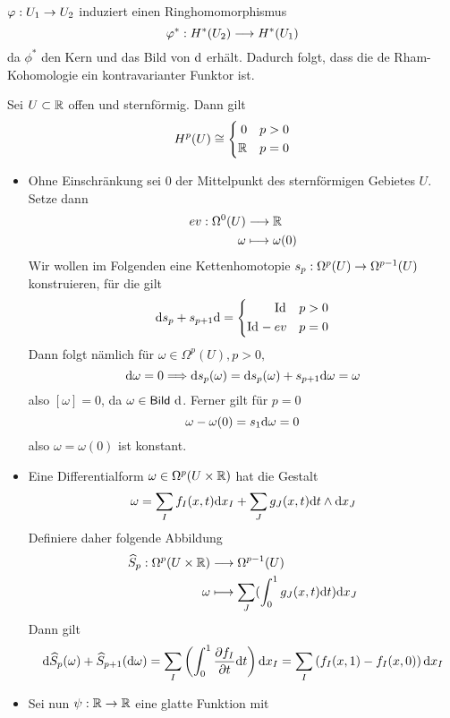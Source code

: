 \Bem{}
$\varphi : U_1 \overset{}{\rightarrow} U_2$ induziert einen Ringhomomorphismus
\[ \varphi^* : H^*(U_2) \overset{}{\longrightarrow} H^*(U_1) \]
da $\phi^*$ den Kern und das Bild von $\text{d}$ erhält. Dadurch folgt, dass die de Rham-Kohomologie ein kontravarianter Funktor ist.

Sei $U \subset \mathbb{R}$ offen und sternförmig. Dann gilt
\[ 
H^p(U) \overset{}{\cong} \left\lbrace
\begin{aligned}
0 && p > 0\\
\mathbb{R} && p =0
\end{aligned}
\right.
\]

\begin{Beweis}{}
\begin{itemize}
	\item Ohne Einschränkung sei $0$ der Mittelpunkt des sternförmigen Gebietes $U$. Setze dann
	\begin{align*}
	ev : \Omega^0(U) & \overset{}{\longrightarrow} \mathbb{R} \\
	\omega & \longmapsto \omega(0)
	\end{align*}
	Wir wollen im Folgenden eine Kettenhomotopie $s_p : \Omega^p(U) \overset{}{\rightarrow} \Omega^{p-1}(U)$ konstruieren, für die gilt
	\[\text{d} s_p + s_{p+1} \text{d} = \left\lbrace
	\begin{aligned}
	\text{Id}_{} && p > 0\\
	\text{Id}_{} - ev && p = 0
	\end{aligned}
	\right. \]
	Dann folgt nämlich für $\omega \in \Omega^p(U), p > 0,$
	\[ \text{d} \omega = 0 \overset{}{\Longrightarrow} \text{d} s_p (\omega) = \text{d} s_p(\omega) +s_{p+1}\text{d}\omega = \omega \]
	also $[\omega] = 0$, da $\omega \in \textsf{Bild}\ \text{d}$. Ferner gilt für $p = 0$
	\[\omega - \omega(0) = s_1\text{d} \omega = 0\]
	also $\omega = \omega(0)$ ist konstant.
	\item Eine Differentialform $\omega \in \Omega^p(U\times \mathbb{R})$ hat die Gestalt
	\begin{align*}
	\omega = \sum_I f_I(x,t) \text{d} x_I + \sum_J g_J(x,t) \text{d} t \wedge \text{d} x_J
	\end{align*}
	Definiere daher folgende Abbildung
	\begin{align*}
	\widehat{S}_p : \Omega^p(U\times \mathbb{R} ) &\overset{}{\longrightarrow} \Omega^{p-1}(U)\\
	\omega & \longmapsto \sum_J (\int_0^1 g_J(x,t) \text{d} t ) \text{d} x_J
	\end{align*}
	Dann gilt
	\[	\text{d} \widehat{S}_p(\omega) + 	\widehat{S}_{p+1}(\text{d}\omega) =
	\sum_I \left( \int_0^1 \frac{\partial f_I}{\partial t} \text{d} t \right) \text{d} x_I 
	=
	\sum_I \left( f_I(x,1) - f_I(x,0)\right) \text{d} x_I   \]
	\item Sei nun $\psi : \mathbb{R} \overset{}{\rightarrow} \mathbb{R}$ eine glatte Funktion mit

\end{itemize}
\end{Beweis}
